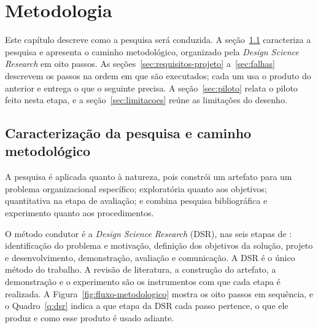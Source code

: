 \chapter{Metodologia}

Este capítulo descreve como a pesquisa será conduzida. A seção~\ref{sec:dsr} caracteriza a pesquisa e apresenta o caminho metodológico, organizado pela \textit{Design Science Research} em oito passos. As seções~\ref{sec:requisitos-projeto} a~\ref{sec:falhas} descrevem os passos na ordem em que são executados; cada um usa o produto do anterior e entrega o que o seguinte precisa. A seção~\ref{sec:piloto} relata o piloto feito nesta etapa, e a seção~\ref{sec:limitacoes} reúne as limitações do desenho.

\section{Caracterização da pesquisa e caminho metodológico}
\label{sec:dsr}

A pesquisa é aplicada quanto à natureza, pois constrói um artefato para um problema organizacional específico; exploratória quanto aos objetivos; quantitativa na etapa de avaliação; e combina pesquisa bibliográfica e experimento quanto aos procedimentos.

O método condutor é a \textit{Design Science Research} (DSR), nas seis etapas de : identificação do problema e motivação, definição dos objetivos da solução, projeto e desenvolvimento, demonstração, avaliação e comunicação. A DSR é o único método do trabalho. A revisão de literatura, a construção do artefato, a demonstração e o experimento são os instrumentos com que cada etapa é realizada. A Figura~\ref{fig:fluxo-metodologico} mostra os oito passos em sequência, e o Quadro~\ref{q:dsr} indica a que etapa da DSR cada passo pertence, o que ele produz e como esse produto é usado adiante.

